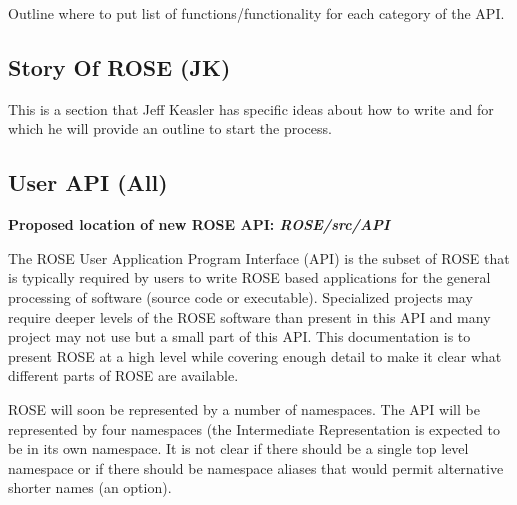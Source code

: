 Outline where to put list of functions/functionality for each category of the API.

\subsection{Story Of ROSE (JK)}
   This is a section that Jeff Keasler has specific ideas about how to write and
for which he will provide an outline to start the process.

\subsection{User API (All)}
{\bf Proposed location of new ROSE API: {\em ROSE/src/API}}

   The ROSE User Application Program Interface (API) is the subset of ROSE that is
typically required by users to write ROSE based applications for the general
processing of software (source code or executable).  Specialized projects may
require deeper levels of the ROSE software than present in this API and many
project may not use but a small part of this API.  This documentation is
to present ROSE at a high level while covering enough detail to make it
clear what different parts of ROSE are available.

   ROSE will soon be represented by a number of namespaces.  The
API will be represented by four namespaces (the Intermediate Representation
is expected to be in its own namespace.  It is not clear if there should
be a single top level namespace or if there should be namespace
aliases that would permit alternative shorter names (an option).



